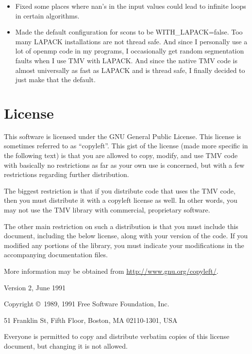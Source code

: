 \documentclass[twoside,letterpaper,11pt]{article}
\begin{document}
\begin{description}
\begin{itemize}
\item Fixed some places where nan's in the input values could lead to
infinite loops in certain algorithms. 

\item Made the default configuration for scons to be WITH\_LAPACK=false.
   Too many LAPACK installations are not thread safe.  And since I 
   personally use a lot of openmp code in my programs, I occasionally
   get random segmentation faults when I use TMV with LAPACK.  
   And since the native TMV code is almost universally as fast as LAPACK
   and is thread safe, I finally decided to just make that the default.


\end{itemize}

\end{description}

\newpage
\section{License}
\label{License}

This software is licensed under the GNU General Public License.  This license is
sometimes referred to as ``copyleft''.  This gist of the license (made more specific
in the following text) is that you are allowed to copy, modify, and use TMV code
with basically no restrictions as far as your own use is concerned, 
but with a few restrictions regarding further distribution.

The biggest restriction is that if you distribute code that
uses the TMV code, then you must distribute it with a copyleft license as well.
In other words, you may not use the TMV library with commercial, proprietary 
software. 

The other main restriction on such a distribution is that you must include this 
document,
including the below license, along with your version of the code.  If you modified
any portions of the library, you must indicate your modifications in the accompanying
documentation files.

More information may be obtained from \url{http://www.gnu.org/copyleft/}.

\begin{center}
{\parindent 0in

Version 2, June 1991

Copyright \copyright\ 1989, 1991 Free Software Foundation, Inc.

\bigskip

51 Franklin St, Fifth Floor, Boston, MA  02110-1301, USA

\bigskip

Everyone is permitted to copy and distribute verbatim copies
of this license document, but changing it is not allowed.
}
\end{center}
\end{document}
